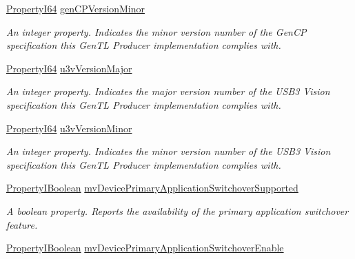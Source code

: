 \begin{DoxyCompactItemize}
\hyperlink{group___common_interface_ga81749b2696755513663492664a18a893}{Property\+I64} \hyperlink{classmv_i_m_p_a_c_t_1_1acquire_1_1_gen_i_cam_1_1_interface_module_a704addfaacfd995b67090cc56b6cc982}{gen\+C\+P\+Version\+Minor}
\begin{DoxyCompactList}\small\item\em An integer property. Indicates the minor version number of the Gen\+C\+P specification this Gen\+T\+L Producer implementation complies with. \end{DoxyCompactList}\item 
\hyperlink{group___common_interface_ga81749b2696755513663492664a18a893}{Property\+I64} \hyperlink{classmv_i_m_p_a_c_t_1_1acquire_1_1_gen_i_cam_1_1_interface_module_a460a7882c3ca2190477690c79134f58b}{u3v\+Version\+Major}
\begin{DoxyCompactList}\small\item\em An integer property. Indicates the major version number of the U\+S\+B3 Vision specification this Gen\+T\+L Producer implementation complies with. \end{DoxyCompactList}\item 
\hyperlink{group___common_interface_ga81749b2696755513663492664a18a893}{Property\+I64} \hyperlink{classmv_i_m_p_a_c_t_1_1acquire_1_1_gen_i_cam_1_1_interface_module_ad6df74ba9a4ae0eff8d6a41cbb9aa314}{u3v\+Version\+Minor}
\begin{DoxyCompactList}\small\item\em An integer property. Indicates the minor version number of the U\+S\+B3 Vision specification this Gen\+T\+L Producer implementation complies with. \end{DoxyCompactList}\item 
\hyperlink{group___common_interface_ga44f9437e24b21b6c93da9039ec6786aa}{Property\+I\+Boolean} \hyperlink{classmv_i_m_p_a_c_t_1_1acquire_1_1_gen_i_cam_1_1_interface_module_a3f9e99053d780484f731fa67521ceaf2}{mv\+Device\+Primary\+Application\+Switchover\+Supported}
\begin{DoxyCompactList}\small\item\em A boolean property. Reports the availability of the primary application switchover feature. \end{DoxyCompactList}\item 
\hyperlink{group___common_interface_ga44f9437e24b21b6c93da9039ec6786aa}{Property\+I\+Boolean} \hyperlink{classmv_i_m_p_a_c_t_1_1acquire_1_1_gen_i_cam_1_1_interface_module_a586bf3a6ba728934f75c42399990d897}{mv\+Device\+Primary\+Application\+Switchover\+Enable}

\end{DoxyCompactItemize}
